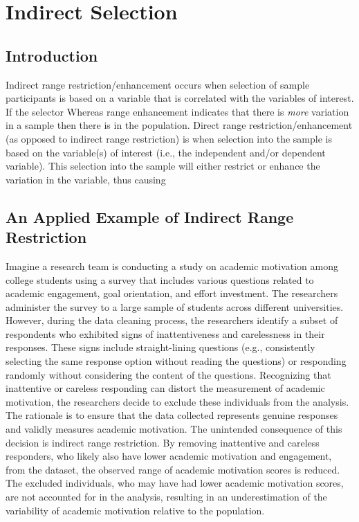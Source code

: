 \documentclass[
  letterpaper,
  DIV=11,
  numbers=noendperiod]{scrreprt}
\begin{document}
\hypertarget{indirect-selection}{%
\chapter{Indirect Selection}\label{indirect-selection}}

\hypertarget{introduction-6}{%
\section{Introduction}\label{introduction-6}}

Indirect range restriction/enhancement occurs when selection of sample
participants is based on a variable that is correlated with the
variables of interest. If the selector Whereas range enhancement
indicates that there is \emph{more} variation in a sample then there is
in the population. Direct range restriction/enhancement (as opposed to
indirect range restriction) is when selection into the sample is based
on the variable(s) of interest (i.e., the independent and/or dependent
variable). This selection into the sample will either restrict or
enhance the variation in the variable, thus causing

\hypertarget{an-applied-example-of-indirect-range-restriction}{%
\section{An Applied Example of Indirect Range
Restriction}\label{an-applied-example-of-indirect-range-restriction}}

Imagine a research team is conducting a study on academic motivation
among college students using a survey that includes various questions
related to academic engagement, goal orientation, and effort investment.
The researchers administer the survey to a large sample of students
across different universities. However, during the data cleaning
process, the researchers identify a subset of respondents who exhibited
signs of inattentiveness and carelessness in their responses. These
signs include straight-lining questions (e.g., consistently selecting
the same response option without reading the questions) or responding
randomly without considering the content of the questions. Recognizing
that inattentive or careless responding can distort the measurement of
academic motivation, the researchers decide to exclude these individuals
from the analysis. The rationale is to ensure that the data collected
represents genuine responses and validly measures academic motivation.
The unintended consequence of this decision is indirect range
restriction. By removing inattentive and careless responders, who likely
also have lower academic motivation and engagement, from the dataset,
the observed range of academic motivation scores is reduced. The
excluded individuals, who may have had lower academic motivation scores,
are not accounted for in the analysis, resulting in an underestimation
of the variability of academic motivation relative to the population.
\end{document}
